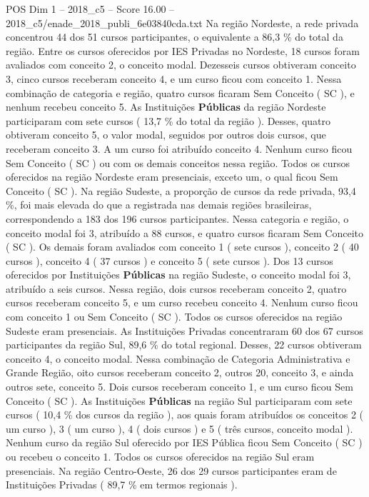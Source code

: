 \begin{textsample}{POS Dim 1 – 2018\_c5 – Score 16.00 – 2018\_c5/enade\_2018\_publi\_6e03840cda.txt}
Na região Nordeste, a rede privada concentrou 44 dos 51 cursos participantes, o equivalente a 86,3 \% do total da região.
Entre os cursos oferecidos por IES Privadas no Nordeste, 18 cursos foram avaliados com conceito 2, o conceito modal.
Dezesseis cursos obtiveram conceito 3, cinco cursos receberam conceito 4, e um curso ficou com conceito 1.
Nessa combinação de categoria e região, quatro cursos ficaram Sem Conceito ( SC ), e nenhum recebeu conceito 5.
As Instituições \textbf{Públicas} da região Nordeste participaram com sete cursos ( 13,7 \% do total da região ).
Desses, quatro obtiveram conceito 5, o valor modal, seguidos por outros dois cursos, que receberam conceito 3.
A um curso foi atribuído conceito 4.
Nenhum curso ficou Sem Conceito ( SC ) ou com os demais conceitos nessa região.
Todos os cursos oferecidos na região Nordeste eram presenciais, exceto um, o qual ficou Sem Conceito ( SC ).
Na região Sudeste, a proporção de cursos da rede privada, 93,4 \%, foi mais elevada do que a registrada nas demais regiões brasileiras, correspondendo a 183 dos 196 cursos participantes.
Nessa categoria e região, o conceito modal foi 3, atribuído a 88 cursos, e quatro cursos ficaram Sem Conceito ( SC ).
Os demais foram avaliados com conceito 1 ( sete cursos ), conceito 2 ( 40 cursos ), conceito 4 ( 37 cursos ) e conceito 5 ( sete cursos ).
Dos 13 cursos oferecidos por Instituições \textbf{Públicas} na região Sudeste, o conceito modal foi 3, atribuído a seis cursos.
Nessa região, dois cursos receberam conceito 2, quatro cursos receberam conceito 5, e um curso recebeu conceito 4.
Nenhum curso ficou com conceito 1 ou Sem Conceito ( SC ).
Todos os cursos oferecidos na região Sudeste eram presenciais.
As Instituições Privadas concentraram 60 dos 67 cursos participantes da região Sul, 89,6 \% do total regional.
Desses, 22 cursos obtiveram conceito 4, o conceito modal.
Nessa combinação de Categoria Administrativa e Grande Região, oito cursos receberam conceito 2, outros 20, conceito 3, e ainda outros sete, conceito 5.
Dois cursos receberam conceito 1, e um curso ficou Sem Conceito ( SC ).
As Instituições \textbf{Públicas} na região Sul participaram com sete cursos ( 10,4 \% dos cursos da região ), aos quais foram atribuídos os conceitos 2 ( um curso ), 3 ( um curso ), 4 ( dois cursos ) e 5 ( três cursos, conceito modal ).
Nenhum curso da região Sul oferecido por IES Pública ficou Sem Conceito ( SC ) ou recebeu o conceito 1.
Todos os cursos oferecidos na região Sul eram presenciais.
Na região Centro-Oeste, 26 dos 29 cursos participantes eram de Instituições Privadas ( 89,7 \% em termos regionais ).

\end{textsample}
